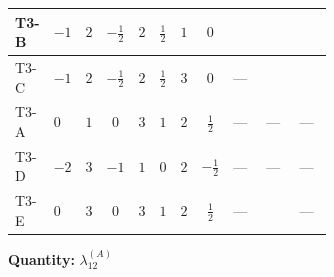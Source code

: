 \documentclass[8pt]{article}
\begin{document}
\begin{landscape}
\begin{longtable}{@{}llcccccc >{\raggedright\arraybackslash}p{0.21\linewidth} >{\raggedright\arraybackslash}p{0.21\linewidth} >{\raggedright\arraybackslash}p{0.21\linewidth}@{}}
T3-B & $-1$ & $2$ & $-\frac{1}{2}$ & $2$ & $\frac{1}{2}$ & $1$ & $0$ & \scriptsize\adjustbox{max width=\linewidth}{$\begin{gathered} +\frac{2}{3} (\left({\lambda_{10}}\right)^{*}+\left({\lambda_{11}}\right)^{*}) \operatorname{Tr}\!\left({y_2}\,\left({y_1}\right)^{\dagger}\right)\end{gathered}$} & \scriptsize\adjustbox{max width=\linewidth}{$\begin{gathered} -\frac{8}{3} \operatorname{Tr}\!\left({y_1}\,\left({y_1}\right)^{\dagger}\,{y_2}\,\left({y_2}\right)^{\dagger}\right)\end{gathered}$} & \scriptsize\adjustbox{max width=\linewidth}{$\begin{gathered} +\frac{64}{3} {\lambda_{9}} \left({\lambda_{9}}\right)^{*}\end{gathered}$} \\
\midrule
T3-C & $-1$ & $2$ & $-\frac{1}{2}$ & $2$ & $\frac{1}{2}$ & $3$ & $0$ & --- & \scriptsize\adjustbox{max width=\linewidth}{$\begin{gathered} -\frac{2}{3} \operatorname{Tr}\!\left({y_1}\,\left({y_1}\right)^{\dagger}\,{y_2}\,\left({y_2}\right)^{\dagger}\right)\end{gathered}$} & \scriptsize\adjustbox{max width=\linewidth}{$\begin{gathered} +\frac{64}{3} {\lambda_{9}} \left({\lambda_{9}}\right)^{*}\end{gathered}$} \\
\midrule
T3-A & $0$ & $1$ & $0$ & $3$ & $1$ & $2$ & $\frac{1}{2}$ & --- & --- & --- \\
\midrule
T3-D & $-2$ & $3$ & $-1$ & $1$ & $0$ & $2$ & $-\frac{1}{2}$ & --- & --- & --- \\
\midrule
T3-E & $0$ & $3$ & $0$ & $3$ & $1$ & $2$ & $\frac{1}{2}$ & --- & \scriptsize\adjustbox{max width=\linewidth}{$\begin{gathered} +\frac{2}{3} \operatorname{Tr}\!\left({y_1}\,\left({y_1}\right)^{\dagger}\,{y_2}\,\left({y_2}\right)^{\dagger}\right)\end{gathered}$} & --- \\
\midrule
\bottomrule
\end{longtable}
\clearpage
\noindent\textbf{Quantity: }$\lambda_{12}^{(A)}$\par\smallskip

\end{landscape}
\end{document}

